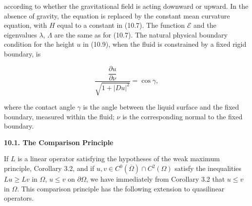 
according to whether the gravitational field is acting downward or upward. In the
absence of gravity, the equation is replaced by the constant mean curvature equation, with $H$ equal to a constant in (10.7). The function $\mathcal{E}$ and the eigenvalues $\lambda$, $\Lambda$ are the same as for (10.7). The natural physical boundary condition for the height $u$ in (10.9), when the fluid is constrained by a fixed rigid boundary, is

\[
\frac{\dfrac{\partial u}{\partial \nu}}{\sqrt{1 + |Du|^2}} = \cos \gamma,
\]

where the contact angle $\gamma$ is the angle between the liquid surface and the fixed boundary, measured within the fluid; $\nu$ is the corresponding normal to the fixed boundary.

\bigskip

\noindent\textbf{10.1. The Comparison Principle}

If $L$ is a linear operator satisfying the hypotheses of the weak maximum principle, Corollary 3.2, and if $u, v \in C^0(\overline{\Omega}) \cap C^2(\Omega)$ satisfy the inequalities $Lu \geq Lv$ in $\Omega$, $u \leq v$ on $\partial \Omega$, we have immediately from Corollary 3.2 that $u \leq v$ in $\Omega$. This comparison principle has the following extension to quasilinear operators.

\medskip

